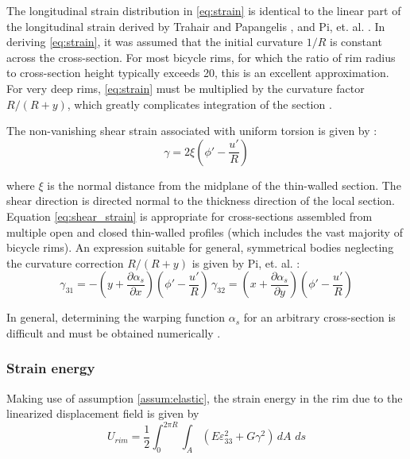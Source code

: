 \documentclass[\rootdir/thesis.tex]{subfiles}
\begin{document}
The longitudinal strain distribution in \eqref{eq:strain} is identical to the linear part of the longitudinal strain derived by Trahair and Papangelis \cite{Trahair1987}, and Pi, et. al. \cite{Pi1995}. In deriving \eqref{eq:strain}, it was assumed that the initial curvature $1/R$ is constant across the cross-section. For most bicycle rims, for which the ratio of rim radius to cross-section height typically exceeds 20, this is an excellent approximation. For very deep rims, \eqref{eq:strain} must be multiplied by the curvature factor $R/(R+y)$, which greatly complicates integration of the section \cite{Kang1994,Lim2004,Ryu2012}.

The non-vanishing shear strain associated with uniform torsion is given by \cite{Timoshenko1961,Pi1995,Kang1994}:
\begin{equation}
\label{eq:shear_strain}
\gamma = 2 \xi \left(\phi' - \frac{u'}{R}\right)
\end{equation}

where $\xi$ is the normal distance from the midplane of the thin-walled section. The shear direction is directed normal to the thickness direction of the local section. Equation \eqref{eq:shear_strain} is appropriate for cross-sections assembled from multiple open and closed thin-walled profiles (which includes the vast majority of bicycle rims). An expression suitable for general, symmetrical bodies neglecting the curvature correction $R/(R+y)$ is given by Pi, et. al. \cite{Pi2006}:
\begin{equation}
\gamma_{31} = -\left(y + \frac{\partial \alpha_s}{\partial x}\right)\left(\phi' - \frac{u'}{R}\right)\,
\gamma_{32} = \left(x + \frac{\partial \alpha_s}{\partial y}\right)\left(\phi' - \frac{u'}{R}\right)
\end{equation}

In general, determining the warping function $\alpha_s$ for an arbitrary cross-section is difficult and must be obtained numerically \cite{warping}.


\subsubsection{Strain energy}
Making use of assumption \ref{assum:elastic}, the strain energy in the rim due to the linearized displacement field is given by
\begin{equation}
\label{eq:U_rim_gen}
U_{rim} = \frac{1}{2}\int_0^{2\pi R} \int_A (E\varepsilon_{33}^2 + G\gamma^2) \,dA\,\, ds
\end{equation}
\end{document}
